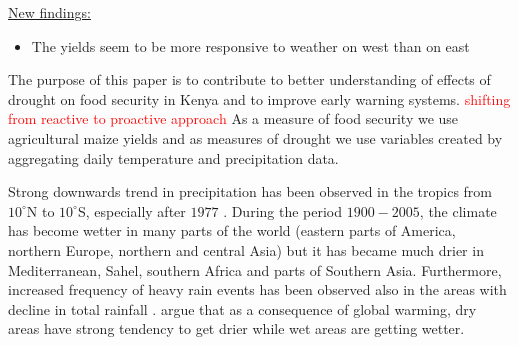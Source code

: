\documentclass[a4paper,12pt]{article}
\begin{document}
\underline{New findings:}

\begin{itemize}
\item The yields seem to be more responsive to weather on west than on east
\end{itemize}
\normalsize
\FloatBarrier

The purpose of this paper is to contribute to better understanding of effects of drought on food security in Kenya and to improve early warning systems. \textcolor{red}{shifting from reactive to proactive approach} As a measure of food security we use agricultural maize yields and as measures of drought we use variables created by aggregating daily temperature and precipitation data.


 Strong downwards trend in precipitation has been observed in the tropics from $10^\circ$N to $10^\circ$S, especially after $1977$ \citep{IPCCtrenberth}. During the period $1900-2005$, the climate has become wetter in many parts of the world (eastern parts of America, northern Europe, northern and central Asia) but it has became much drier in Mediterranean, Sahel, southern Africa and parts of Southern Asia. Furthermore, increased frequency of heavy rain events has been observed also in the areas with decline in total rainfall \citep{IPCCtrenberth}. \cite{Trenberth2014} argue that as a consequence of global warming, dry areas have strong tendency to get drier while wet areas are getting wetter. 
 
\end{document}
